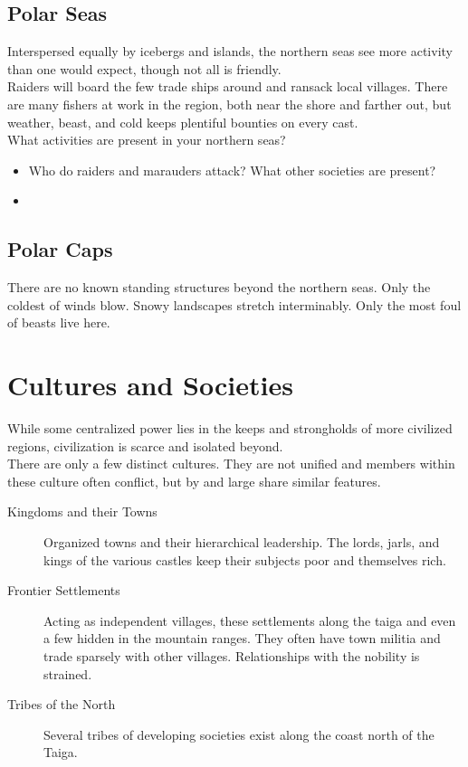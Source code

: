 \documentclass[a4paper]{article}
\begin{document}
\begin{multicols}{2}
\subsection{Polar Seas} Interspersed equally by icebergs and islands, the northern seas see more activity than one would expect, though not all is friendly. \\

Raiders will board the few trade ships around and ransack local villages. There are many fishers at work in the region, both near the shore and farther out, but weather, beast, and cold keeps plentiful bounties on every cast. \\

What activities are present in your northern seas?

\begin{itemize}
\item Who do raiders and marauders attack? What other societies are present?
\item 
\end{itemize}

\subsection{Polar Caps}

There are no known standing structures beyond the northern seas. Only the coldest of winds blow. Snowy landscapes stretch interminably. Only the most foul of beasts live here.

\section{Cultures and Societies}

While some centralized power lies in the keeps and strongholds of more civilized regions, civilization is scarce and isolated beyond. \\

There are only a few distinct cultures. They are not unified and members within these culture often conflict, but by and large share similar features.

\begin{description}
\item[Kingdoms and their Towns] Organized towns and their hierarchical leadership. The lords, jarls, and kings of the various castles keep their subjects poor and themselves rich. 
\item[Frontier Settlements] Acting as independent villages, these settlements along the taiga and even a few hidden in the mountain ranges. They often have town militia and trade sparsely with other villages. Relationships with the nobility is strained.
\item[Tribes of the North] Several tribes of developing societies exist along the coast north of the Taiga. 
\end{description}



\end{multicols}
\end{document}
